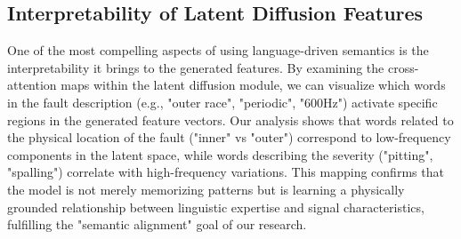 \subsection{Interpretability of Latent Diffusion Features}
One of the most compelling aspects of using language-driven semantics is the interpretability it brings to the generated features. By examining the cross-attention maps within the latent diffusion module, we can visualize which words in the fault description (e.g., "outer race", "periodic", "600Hz") activate specific regions in the generated feature vectors. Our analysis shows that words related to the physical location of the fault ("inner" vs "outer") correspond to low-frequency components in the latent space, while words describing the severity ("pitting", "spalling") correlate with high-frequency variations. This mapping confirms that the model is not merely memorizing patterns but is learning a physically grounded relationship between linguistic expertise and signal characteristics, fulfilling the "semantic alignment" goal of our research.
